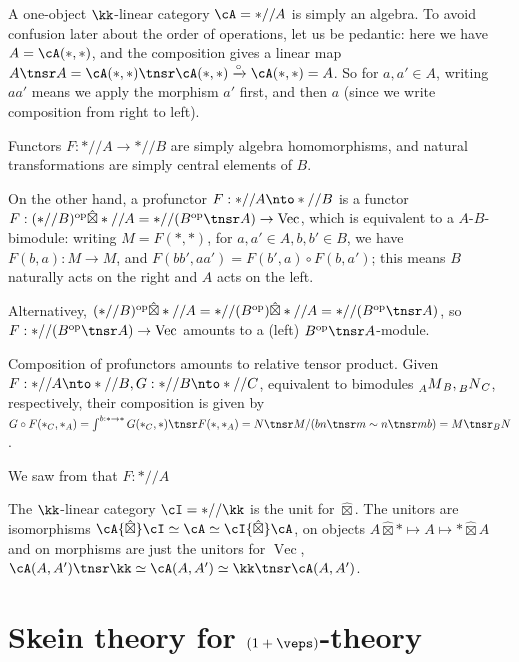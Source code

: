 \documentclass[12pt]{article}
\newcommand{\op}{{\text{op}}}
\newcommand{\hatbox}{{\hat{\boxtimes}}}
\DeclareMathOperator{\Vect}{Vec}
\begin{document}
\begin{example}
\label{x:profunctor-bimodule}
A one-object $\kk$-linear category $\cA = *//A$
is simply an algebra.
To avoid confusion later about the order of operations,
let us be pedantic: here we have $A = \cA(*,*)$,
and the composition gives a linear map
$A \tnsr A = \cA(*,*) \tnsr \cA(*,*) \xrightarrow{\circ} \cA(*,*) = A$.
So for $a,a'\in A$,
writing $aa'$ means we apply the morphism $a'$ first,
and then $a$
(since we write composition from right to left).

Functors $F: *//A \to *//B$ are simply algebra homomorphisms,
and natural transformations are simply central elements of $B$.

On the other hand, a profunctor $F: *//A \nto *//B$
is a functor
$F: (*//B)^\op \hatbox *//A = *//(B^\op \tnsr A) \to \Vect$,
which is equivalent to a $A$-$B$-bimodule:
writing $M = F(*,*)$,
for $a,a' \in A, b,b' \in B$,
we have $F(b,a): M \to M$,
and $F(bb',aa') = F(b',a) \circ F(b,a')$;
this means $B$ naturally acts on the right
and $A$ acts on the left.

Alternativey,
$(*//B)^\op \hatbox *//A = *//(B^\op) \hatbox *//A = *//(B^\op \tnsr A)$,
so $F: *//(B^\op \tnsr A) \to \Vect$
amounts to a (left) $B^\op \tnsr A$-module.


Composition of profunctors amounts to relative tensor product.
Given $F: *//A \nto *//B, G: *//B \nto *//C$,
equivalent to bimodules $\prescript{}{A}M_B,
\prescript{}{B}N_C$, respectively,
their composition is given by
$G \circ F(*_C,*_A) = \int^{b:* \to *} G(*_C,*) \tnsr F(*,*_A)
= N \tnsr M / (bn \tnsr m \sim n \tnsr mb)
= M \tnsr_B N$.
\end{example}


\begin{remark}
We saw from 
that $F: *//A$
\end{remark}


\begin{example}
The $\kk$-linear category $\cI = *//\kk$
is the unit for $\hatbox$.
The unitors are isomorphisms
$\cA \hatbox \cI \simeq \cA \simeq \cI \hatbox \cA$,
on objects
$A \hatbox * \mapsto A \mapsto * \hatbox A$
and on morphisms are just the unitors for $\Vect$,
$\cA(A,A') \tnsr \kk \simeq \cA(A,A') \simeq
\kk \tnsr \cA(A,A')$.
\end{example}


\section{Skein theory for $(1+\veps)$-theory}
\label{s:skeins}
\end{document}
